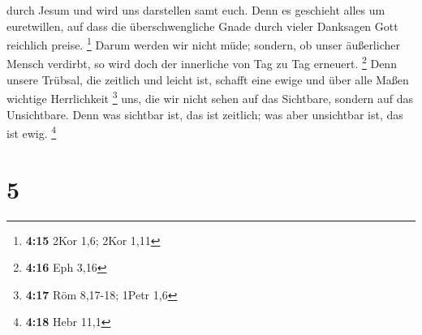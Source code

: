 durch Jesum und wird uns darstellen samt euch.  Denn es
geschieht alles um euretwillen, auf dass die überschwengliche Gnade
durch vieler Danksagen Gott reichlich preise. \footnote{\textbf{4:15}
  2Kor 1,6; 2Kor 1,11}  Darum werden wir nicht müde;
sondern, ob unser äußerlicher Mensch verdirbt, so wird doch der
innerliche von Tag zu Tag erneuert. \footnote{\textbf{4:16} Eph 3,16}
 Denn unsere Trübsal, die zeitlich und leicht ist,
schafft eine ewige und über alle Maßen wichtige Herrlichkeit \footnote{\textbf{4:17}
  Röm 8,17-18; 1Petr 1,6}  uns, die wir nicht sehen auf
das Sichtbare, sondern auf das Unsichtbare. Denn was sichtbar ist, das
ist zeitlich; was aber unsichtbar ist, das ist ewig. \footnote{\textbf{4:18}
  Hebr 11,1}

\hypertarget{section-4}{%
\section{5}\label{section-4}}

